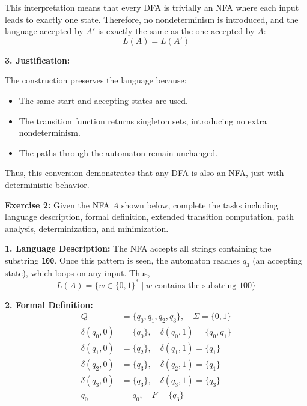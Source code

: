 \documentclass{article}
\theoremstyle{theorem}
\theoremstyle{definition}
\theoremstyle{remark}
\begin{document}
This interpretation means that every DFA is trivially an NFA where each input leads to exactly one state. Therefore, no nondeterminism is introduced, and the language accepted by $A'$ is exactly the same as the one accepted by $A$:
\[
L(A) = L(A')
\]

\textbf{3. Justification:}

The construction preserves the language because:
\begin{itemize}
  \item The same start and accepting states are used.
  \item The transition function returns singleton sets, introducing no extra nondeterminism.
  \item The paths through the automaton remain unchanged.
\end{itemize}

Thus, this conversion demonstrates that any DFA is also an NFA, just with deterministic behavior.

\textbf{Exercise 2:} Given the NFA $A$ shown below, complete the tasks including language description, formal definition, extended transition computation, path analysis, determinization, and minimization.

\begin{center}
\end{center}

\textbf{1. Language Description:}  
The NFA accepts all strings containing the substring \texttt{100}. Once this pattern is seen, the automaton reaches $q_3$ (an accepting state), which loops on any input. Thus, 
\[
L(A) = \{ w \in \{0,1\}^* \mid w \text{ contains the substring } 100 \}
\]

\textbf{2. Formal Definition:}
\[
\begin{aligned}
Q &= \{q_0, q_1, q_2, q_3\}, \quad \Sigma = \{0,1\} \\
\delta(q_0, 0) &= \{q_0\}, \quad \delta(q_0, 1) = \{q_0, q_1\} \\
\delta(q_1, 0) &= \{q_2\}, \quad \delta(q_1, 1) = \{q_1\} \\
\delta(q_2, 0) &= \{q_3\}, \quad \delta(q_2, 1) = \{q_1\} \\
\delta(q_3, 0) &= \{q_3\}, \quad \delta(q_3, 1) = \{q_3\} \\
q_0 &= q_0, \quad F = \{q_3\}
\end{aligned}
\]
\end{document}
